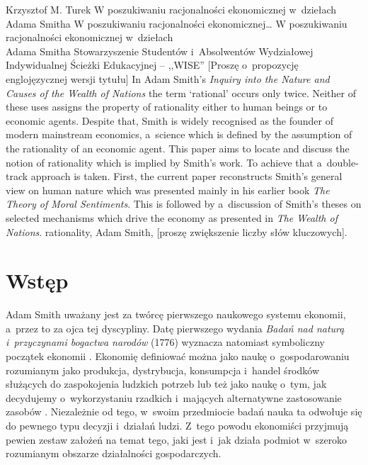 \begin{artplenv}{Krzysztof M. Turek}
	{W poszukiwaniu racjonalności ekonomicznej w~dziełach Adama Smitha}
	{W poszukiwaniu racjonalności ekonomicznej\ldots}
	{W poszukiwaniu racjonalności ekonomicznej w~dziełach\\Adama Smitha}
	{Stowarzyszenie Studentów i~Absolwentów Wydziałowej Indywidualnej Ścieżki Edukacyjnej -- ,,WISE''}
	{[Proszę o~propozycję englojęzycznej wersji tytułu]}
	{In Adam Smith's \textit{Inquiry into the Nature and Causes of the Wealth of Nations} the term `rational' occurs only twice. Neither of these uses assigns the property of rationality either to human beings or to economic agents. Despite that, Smith is widely recognised as the founder of modern mainstream economics, a~science which is defined by the assumption of the rationality of an economic agent. This paper aims to locate and discuss the notion of rationality which is implied by Smith's work. To achieve that a~double-track approach is taken. First, the current paper reconstructs Smith's general view on human nature which was presented mainly in his earlier book \textit{The Theory of Moral Sentiments}. This is followed by a~discussion of Smith's theses on selected mechanisms which drive the economy as presented in \textit{The Wealth of Nations}.}
	{rationality, Adam Smith, [proszę zwiększenie liczby słów kluczowych].}
	


\section*{Wstęp}

Adam Smith uważany jest za twórcę pierwszego naukowego systemu ekonomii, a~przez to za ojca tej dyscypliny. Datę
pierwszego wydania \textit{Badań nad naturą i~przyczynami bogactwa narodów} (1776) wyznacza natomiast symboliczny
początek ekonomii
\parencite[s.~25]{samuelson_ekonomia_2000}.
Ekonomię definiować można jako
naukę o~gospodarowaniu
\parencite[s.~17]{milewski_elementarne_2003}
rozumianym jako produkcja, dystrybucja,
konsumpcja i~handel środków służących do zaspokojenia ludzkich potrzeb lub też jako naukę o~tym, jak decydujemy o~wykorzystaniu
rzadkich i~mających alternatywne zastosowanie zasobów
\parencite{black_slownik_2008,samuelson_ekonomia_2000}.
Niezależnie od tego, w~swoim przedmiocie badań nauka ta odwołuje się do pewnego typu decyzji i~działań
ludzi. Z~tego powodu ekonomiści przyjmują pewien zestaw założeń na temat tego, jaki jest i~jak działa podmiot w~szeroko
rozumianym obszarze działalności gospodarczych.


\end{artplenv}
